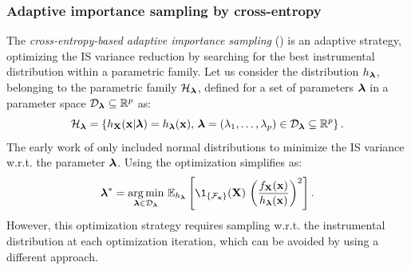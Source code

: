 \subsubsection{Adaptive importance sampling by cross-entropy}

The \textit{cross-entropy-based adaptive importance sampling} () is an adaptive strategy, optimizing the IS variance reduction by searching for the best instrumental distribution within a parametric family. 
Let us consider the distribution $h_{{\boldsymbol{\lambda}}}$, belonging to the parametric family $\mathcal{H}_{\boldsymbol{\lambda}}$, defined for a set of parameters ${\boldsymbol{\lambda}}$ in a parameter space $\mathcal{D}_{{\boldsymbol{\lambda}}} \subseteq \mathbb{R}^p$ as: 
\begin{equation}
    \mathcal{H}_{\boldsymbol{\lambda}} = \left\{h_{\bf X}({\bf x} | {\boldsymbol{\lambda}}) = h_{{\boldsymbol{\lambda}}}({\bf x}), \, {\boldsymbol{\lambda}} = (\lambda_1, \dots, \lambda_p) \in \mathcal{D}_{\boldsymbol{\lambda}} \subseteq \mathbb{R}^p\right\}.
\end{equation} 
The early work of \citet{bucher_1988_AIS} only included normal distributions to minimize the IS variance w.r.t. the parameter ${\boldsymbol{\lambda}}$.
Using  the optimization simplifies as:
\begin{equation}
    \blambda^* = \argmin_{\blambda \in \iD_\blambda} \, \E_{h_\blambda}\left[ \1_{\{\iF_\bx\}}(\bX) \, \left(\frac{f_\bX(\bx)}{h_\blambda(\bx)}\right)^2 \right]. 
\end{equation}
However, this optimization strategy requires sampling w.r.t. the instrumental distribution at each optimization iteration, which can be avoided by using a different approach. 

